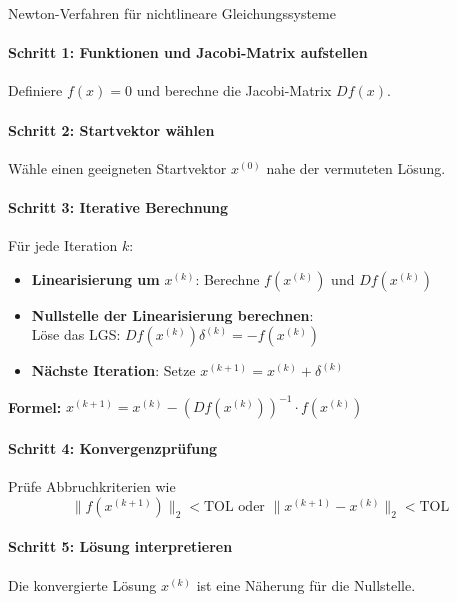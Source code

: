 \begin{KR}{Newton-Verfahren für nichtlineare Gleichungssysteme}
\paragraph{Schritt 1: Funktionen und Jacobi-Matrix aufstellen}
Definiere $f(x) = 0$ und berechne die Jacobi-Matrix $Df(x)$.

\paragraph{Schritt 2: Startvektor wählen}
Wähle einen geeigneten Startvektor $x^{(0)}$ nahe der vermuteten Lösung.

\paragraph{Schritt 3: Iterative Berechnung}
Für jede Iteration $k$:
\begin{itemize}
    \item \textbf{Linearisierung um} $x^{(k)}$: Berechne $f(x^{(k)})$ und $Df(x^{(k)})$
    \item \textbf{Nullstelle der Linearisierung berechnen}: \\ Löse das LGS: $Df(x^{(k)}) \delta^{(k)} = -f(x^{(k)})$
    \item \textbf{Nächste Iteration}: Setze $x^{(k+1)} = x^{(k)} + \delta^{(k)}$
\end{itemize}
\vspace{2mm}
\textbf{Formel:}
        $x^{(k+1)}=x^{(k)}-(D f(x^{(k)}))^{-1} \cdot f(x^{(k)})$
\paragraph{Schritt 4: Konvergenzprüfung}
Prüfe Abbruchkriterien wie $$\|f(x^{(k+1)})\|_2 < \text{TOL} \text{ oder } \|x^{(k+1)} - x^{(k)}\|_2 < \text{TOL}$$

\paragraph{Schritt 5: Lösung interpretieren}
Die konvergierte Lösung $x^{(k)}$ ist eine Näherung für die Nullstelle.
\end{KR}

